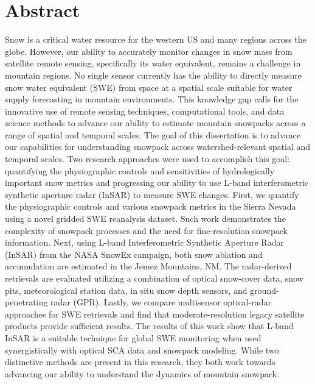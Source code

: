 \documentclass[11pt, oneside, openany]{scrbook}
\begin{document}
\newpage
{}
\setcounter{page}{1} %
\section*{Abstract}
Snow is a critical water resource for the western US and many regions across the globe. However, our ability to accurately monitor changes in snow mass from satellite remote sensing, specifically its water equivalent, remains a challenge in mountain regions. No single sensor currently has the ability to directly measure snow water equivalent (SWE) from space at a spatial scale suitable for water supply forecasting in mountain environments. This knowledge gap calls for the innovative use of remote sensing techniques, computational tools, and data science methods to advance our ability to estimate mountain snowpacks across a range of spatial and temporal scales. The goal of this dissertation is to advance our capabilities for understanding snowpack across watershed-relevant spatial and temporal scales. Two research approaches were used to accomplish this goal: quantifying the physiographic controls and sensitivities of hydrologically important snow metrics and progressing our ability to use L-band interferometric synthetic aperture radar (InSAR) to measure SWE changes. First, we quantify the physiographic controls and various snowpack metrics in the Sierra Nevada using a novel gridded SWE reanalysis dataset. Such work demonstrates the complexity of snowpack processes and the need for fine-resolution snowpack information. Next, using L-band Interferometric Synthetic Aperture Radar (InSAR) from the NASA SnowEx campaign, both snow ablation and accumulation are estimated in the Jemez Mountains, NM. The radar-derived retrievals are evaluated utilizing a combination of optical snow-cover data, snow pits, meteorological station data, in situ snow depth sensors, and ground-penetrating radar (GPR). Lastly, we compare multisensor optical-radar approaches for SWE retrievals and find that moderate-resolution legacy satellite products provide sufficient results. The results of this work show that L-band InSAR is a suitable technique for global SWE monitoring when used synergistically with optical SCA data and snowpack modeling. While two distinctive methods are present in this research, they both work towards advancing our ability to understand the dynamics of mountain snowpack.


\newpage
\end{document}
